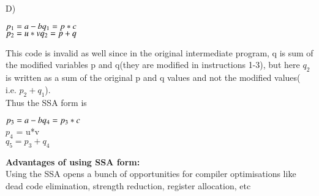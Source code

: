 \documentclass[journal,12pt,twocolumn]{IEEEtran}
\begin{document}
D)
\begin{tcolorbox}[colback=white]
$p_{1}  = a - b \\
q_{1}  = p*c$ \\
$p_{2}  = u*v  \\
q_{2}  = p + q$ \\
\end{tcolorbox}
This code is invalid as well since in the original intermediate program, q is sum of the modified variables p and q(they are modified in instructions 1-3), but here $q_2$ is written as a sum of the original p and q values and not the modified values( i.e. $p_2 + q_1$). \\
Thus the SSA form is 
\begin{tcolorbox}
$p_{3}  = a - b \\
q_{4}  = p_3*c$ \\
$p_{4}$  = u*v \\ 
$q_{5}  = p_{3} + q_{4}$
\end{tcolorbox}

\textbf{Advantages of using SSA form:} \\
Using the SSA opens a bunch of opportunities for compiler optimisations like dead code elimination, strength reduction, register allocation, etc 
\end{document}
